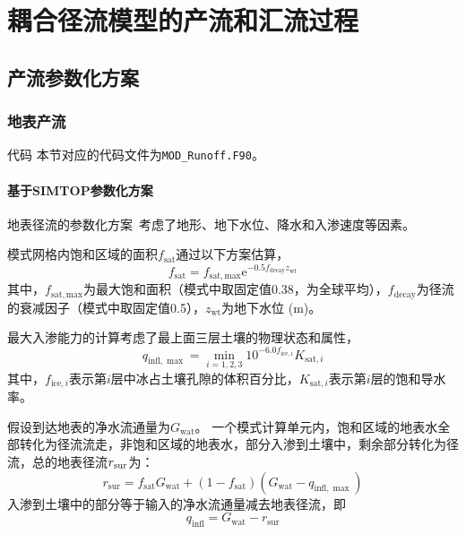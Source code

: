 \chapter{耦合径流模型的产流和汇流过程}

\section{产流参数化方案}

\subsection{地表产流}
\begin{mymdframed}{代码}
  本节对应的代码文件为\texttt{MOD\_Runoff.F90}。
\end{mymdframed}
\subsubsection{基于SIMTOP参数化方案}
地表径流的参数化方案~\citep{niu2005simple}考虑了地形、地下水位、降水和入渗速度等因素。

模式网格内饱和区域的面积$f_{\mathrm{sat}}$通过以下方案估算，
\begin{equation}
  f_{\mathrm{sat}}=f_{\mathrm{sat,max}}  \mathrm{e}^{-0.5  f_{\mathrm{decay}}  z_{\mathrm{wt}}}
\end{equation}
其中，$f_{\mathrm{sat,max}}$为最大饱和面积（模式中取固定值0.38，为全球平均），$f_{\mathrm{decay}}$为径流的衰减因子（模式中取固定值0.5），$z_{\mathrm{wt}}$为地下水位 (m)。

最大入渗能力的计算考虑了最上面三层土壤的物理状态和属性，
\begin{equation}
  q_{\mathrm{infl}, \max }= \min _{i=1,2,3} 10^{-6.0  f_{\mathrm{ice}, i}}  K_{\mathrm{sat}, i}
\end{equation}
其中，$f_{\mathrm{ice},i}$表示第$i$层中冰占土壤孔隙的体积百分比，$K_{\mathrm{sat},i}$表示第$i$层的饱和导水率。

假设到达地表的净水流通量为$G_{\mathrm{wat}}$。 一个模式计算单元内，饱和区域的地表水全部转化为径流流走，非饱和区域的地表水，部分入渗到土壤中，剩余部分转化为径流，总的地表径流$r_{\rm sur}$为：
\begin{equation}
  r_{\mathrm{sur}}=f_{\mathrm{sat}} G_{\mathrm{wat}}+\left(1-f_{\mathrm{sat}}\right)  \left(G_{\mathrm{wat}}-q_{\mathrm{infl},\max}\right)
\end{equation}
入渗到土壤中的部分等于输入的净水流通量减去地表径流，即
\begin{equation}
  q_{\mathrm{infl}}={G}_{\mathrm{wat}}-r_{\mathrm{sur}}
\end{equation}

